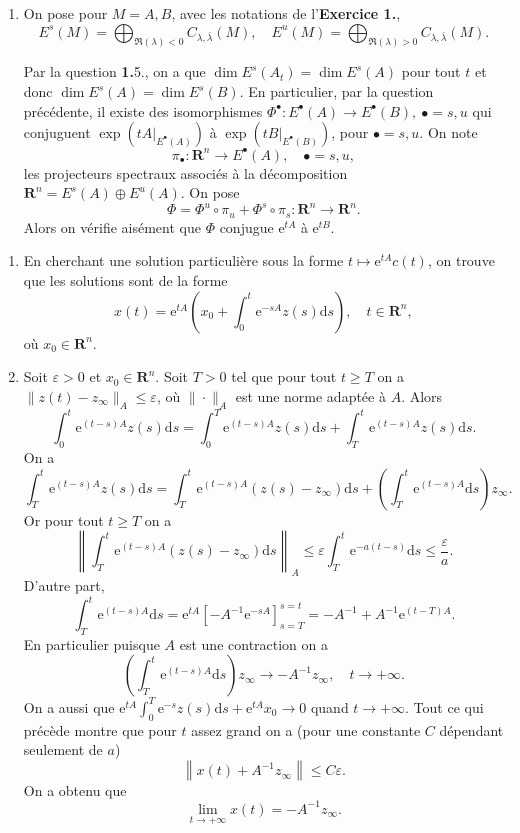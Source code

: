 \documentclass[a4paper,12pt,openany]{article}
\theoremstyle{plain}
\theoremstyle{definition}
\newcommand{\e}{\mathrm{e}}
\newcommand{\dd}{\mathrm{d}}
\newcommand{\R}{\mathbf{R}}
\begin{document}
\begin{enumerate}
\item On pose pour $M = A,B$, avec les notations de l'\textbf{Exercice 1.},
$$
E^s(M) = \bigoplus_{\Re(\lambda) < 0} C_{\lambda, \bar \lambda}(M), \quad E^u(M) = \bigoplus_{\Re(\lambda) > 0} C_{\lambda, \bar \lambda}(M).
$$

Par la question \textbf{1.}5., on a que $\dim E^s(A_t) = \dim E^s(A)$ pour tout $t$ et donc $\dim E^s(A) = \dim E^s(B)$. En particulier, par la question pr\'ec\'edente, il existe des isomorphismes $\Phi^\bullet : E^\bullet(A) \to E^\bullet(B),~\bullet = s,u$ qui conjuguent $\exp(tA|_{E^\bullet(A)})$ \`a $\exp(tB|_{E^\bullet(B)})$, pour $\bullet = s,u.$ On note
$$
\pi_\bullet : \R^n \to E^\bullet(A), \quad \bullet = s,u,
$$
les projecteurs spectraux associ\'es \`a la d\'ecomposition $\R^n = E^s(A) \oplus E^u(A).$ On pose
$$
\Phi = \Phi^u \circ \pi_u + \Phi^s \circ \pi_s : \R^n \to \R^n.
$$
Alors on v\'erifie ais\'ement que $\Phi$ conjugue $\e^{tA}$ \`a $\e^{tB}$.

\end{enumerate}

\vspace{0.6cm}

 \vspace{1.5mm} 

\begin{enumerate}
\item En cherchant une solution particuli\`ere sous la forme $t \mapsto \e^{tA}c(t)$, on trouve que les solutions sont de la forme
$$
x(t) = \e^{tA} \left(x_0 + \int_0^t \e^{-sA}z(s) \dd s\right), \quad t \in \R^n,
$$
o\`u $x_0 \in \R^n$.
\item Soit $\varepsilon > 0$ et $x_0 \in \R^n$. Soit $T > 0$ tel que pour tout $t \geq T$ on a $\|z(t)-z_\infty\|_A \leq \varepsilon$, o\`u $\|\cdot\|_A$ est une norme adapt\'ee \`a $A$. Alors 
$$
\int_0^t\e^{(t-s)A}z(s)\dd s = \int_0^T \e^{(t-s)A}z(s)\dd s + \int_T^t \e^{(t-s)A}z(s)\dd s.
$$
On a 
$$
\int_T^t \e^{(t-s)A}z(s)\dd s = \int_T^t\e^{(t-s)A}(z(s) - z_\infty) \dd s + \left(\int_T^t \e^{(t-s)A}\dd s \right)z_\infty.
$$
Or pour tout $t\geq T$ on a 
$$
\left\|\int_T^t\e^{(t-s)A}(z(s) - z_\infty) \dd s\right\|_A \leq \varepsilon \int_T^t \e^{-a(t-s)} \dd s \leq \frac{\varepsilon}{a}.
$$
D'autre part, 
$$
\int_{T}^t\e^{(t-s)A} \dd s = \e^{tA}\left[-A^{-1}\e^{-sA}\right]_{s=T}^{s=t} = -A^{-1} + A^{-1}\e^{(t-T)A}.
$$
En particulier puisque $A$ est une contraction on a
$$
\left(\int_T^t \e^{(t-s)A}\dd s \right)z_\infty \to -A^{-1}z_\infty, \quad t \to +\infty.
$$
On a aussi que $\displaystyle{\e^{tA} \int_0^T \e^{-s}z(s) \dd s + \e^{tA}x_0 \to 0}$ quand $t \to +\infty$. Tout ce qui pr\'ec\`ede montre que pour $t$ assez grand on a (pour une constante $C$ d\'ependant seulement de $a$)
$$
\left\|x(t) +A^{-1}z_\infty\right\| \leq C \varepsilon.
$$
On a obtenu que 
$$
\lim_{t \to +\infty} x(t) = -A^{-1} z_\infty.
$$
\end{enumerate}
\end{document}
